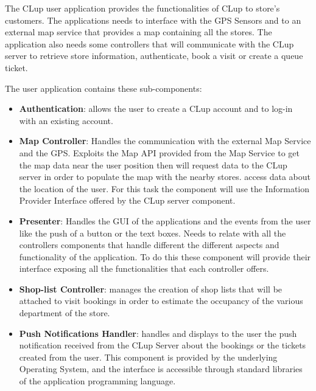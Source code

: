The CLup user application provides the functionalities of CLup to store's customers. The applications needs to interface with the GPS Sensors and to an external map service that provides a map containing all the stores. The application also needs some controllers that will communicate with the CLup server to retrieve store information, authenticate, book a visit or create a queue ticket.

The user application contains these sub-components:
\begin{itemize}
    \item \textbf{Authentication}: allows the user to create a CLup account and to log-in with an existing account.
    \item \textbf{Map Controller}: Handles the communication with the external Map Service and the GPS. Exploits the Map API provided from the Map Service to get the map data near the user position then will request data to the CLup server in order to populate the map with the nearby stores.  access data about the location of the user. For this task the component will use the Information Provider Interface offered by the CLup server component.
    \item \textbf{Presenter}: Handles the GUI of the applications and the events from the user like the push of a button or the text boxes. Needs to relate with all the controllers components that handle different the different aspects and functionality of the application. To do this these component will provide their interface exposing all the functionalities that each controller offers.
    \item \textbf{Shop-list Controller}: manages the creation of shop lists that will be attached to visit bookings in order to estimate the occupancy of the various department of the store.
    \item \textbf{Push Notifications Handler}: handles and displays to the user the push notification received from the CLup Server about the bookings or the tickets created from the user. This component is provided by the underlying Operating System, and the interface is accessible through standard libraries of the application programming language.
\end{itemize}

